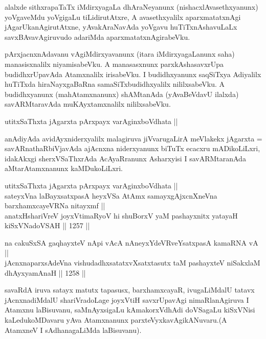 \begin{artha}
alalxde sithxrapaTaTx iMdirxyagaLa dhAraNeyanunx (nishacxlAvasethxyanunx) yoVgaveMdu yoVgigaLu tiLidirutAtxre, A avasethxyalilx aparxmatatxnAgi jAgarUkanAgirutAtxne, yAvakAraNavAda yoVgavu huTiTxnAshavuLaLx savxBAvavAgiruvudo adariMda aparxmatatxnAgirabeVku.
\end{artha}

\begin{artha}
pArxjacnxnAdavanu vAgiMdirxyavanunx (itara iMdirxyagaLanunx saha) manasisxnalilx niyamisabeVku. A manasasxnunx parxkAshasavxrUpa budidhxrUpavAda Atamxnalilx irisabeVku. I budidhxyanunx saqSiTxya Adiyalilx huTiTxda hiraNayxgaBaRna samaSiTxbudidhxyalilx nililxsabeVku. A budidhxyanunx (mahAtamxnanunx) shAMtanAda (yAvaBeVdavU ilalxda) savARMtaravAda muKAyxtamxnalilx nililxsabeVku.
\end{artha}


\begin{shl}
utitxSaThxta jAgarxta pArxpayx varAginxboVdhata || 
\end{shl}

\begin{artha}
anAdiyAda avidAyxniderxyalilx malagiruva jiVvarugaLirA meVlakekx jAgarxta = savARnathaRbiVjavAda ajAcnxna niderxyanunx biTuTx ecacxru mADikoLiLxri, idakAkxgi sherxVSaThxrAda AcAyaRranunx Asharxyisi I savARMtaranAda aMtarAtamxnanunx kaMDukoLiLxri.
\end{artha}


\begin{shl}
utitxSaThxta jAgarxta pArxpayx varAginxboVdhata || \\
sateyxVna laBayxsatxpasA heyxVSa AtAmx samayxgAjxcnXneVna barxhamxcayeVRNa nitayxmf || \\
anatxHshariVreV joyxVtimaRyoV hi shuBorxV yaM pashayxnitx yatayaH kiSxVNadoVSAH \hfill || 1257 ||  
\end{shl}

\begin{shl}
na cakuSxSA gaqhayxteV nApi vAcA nAneyxYdeVRveYsatxpasA kamaRNA vA || \\
jAcnxnaparxsAdeVna vishudadhxsatatxvXsatxtasutx taM pashayxteV niSakxlaM dhAyxyamAnaH \hfill || 1258 ||  
\end{shl}

\begin{artha}
savaRdA iruva satayx matutx tapasusx, barxhamxcayaR, ivugaLiMdalU tatavx jAcnxnadiMdalU shariVradoLage joyxVtiH savxrUpavAgi nimaRlanAgiruva I Atamxnu laBisuvanu, saMnAyxsigaLu kAmakorxVdhAdi doVSagaLu kiSxVNisi kaLedukoMDavaru yAva Atamxnanunx parxteVyxkavAgikANuvaru.(A AtamxneV I sAdhanagaLiMda laBisuvanu).
\end{artha}

